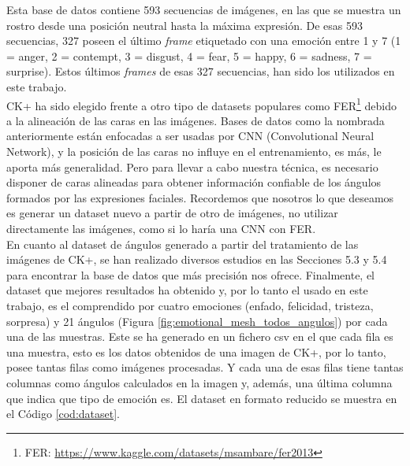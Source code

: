 Esta base de datos contiene 593 secuencias de imágenes, en las que se muestra un rostro desde una posición neutral hasta la máxima expresión. De esas 593 secuencias, 327 poseen el último \textit{frame} etiquetado con una emoción entre 1 y 7 (1 = anger, 2 = contempt, 3 = disgust, 4 = fear, 5 = happy, 6 = sadness, 7 = surprise). Estos últimos \textit{frames} de esas 327 secuencias, han sido los utilizados en este trabajo.\\

CK+ ha sido elegido frente a otro tipo de datasets populares como FER\footnote{FER: \url{https://www.kaggle.com/datasets/msambare/fer2013}} debido a la alineación de las caras en las imágenes. Bases de datos como la nombrada anteriormente están enfocadas a ser usadas por CNN (Convolutional Neural Network), y la posición de las caras no influye en el entrenamiento, es más, le aporta más generalidad. Pero para llevar a cabo nuestra técnica, es necesario disponer de caras alineadas para obtener información confiable de los ángulos formados por las expresiones faciales. Recordemos que nosotros lo que deseamos es generar un dataset nuevo a partir de otro de imágenes, no utilizar directamente las imágenes, como si lo haría una CNN con FER.\\

En cuanto al dataset de ángulos generado a partir del tratamiento de las imágenes de CK+, se han realizado diversos estudios en las Secciones 5.3 y 5.4 para encontrar la base de datos que más precisión nos ofrece. Finalmente, el dataset que mejores resultados ha obtenido y, por lo tanto el usado en este trabajo, es el comprendido por cuatro emociones (enfado, felicidad, tristeza, sorpresa) y 21 ángulos (Figura \ref{fig:emotional_mesh_todos_angulos}) por cada una de las muestras. Este se ha generado en un fichero csv en el que cada fila es una muestra, esto es los datos obtenidos de una imagen de CK+, por lo tanto, posee tantas filas como imágenes procesadas. Y cada una de esas filas tiene tantas columnas como ángulos calculados en la imagen y, además, una última columna que indica que tipo de emoción es. El dataset en formato reducido se muestra en el Código \ref{cod:dataset}.\\

